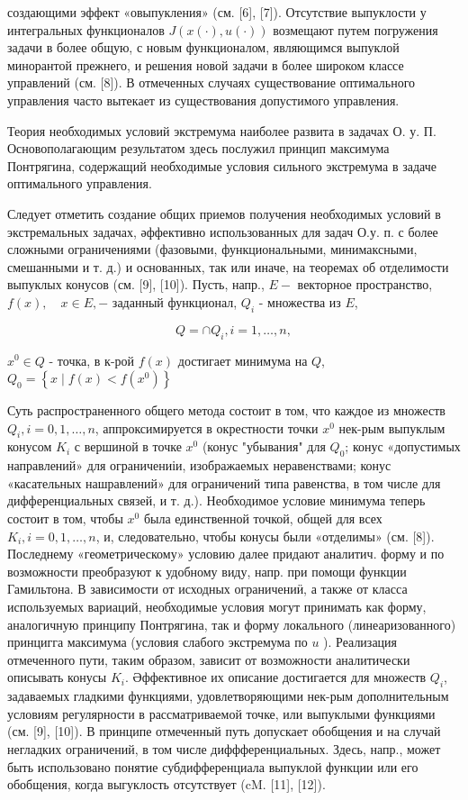 \documentclass[10pt]{article}
\begin{document}
создающими эффект «овыпукления» (см. [6], [7]). Отсутствие выпуклости у интегральных функционалов $J(x(\cdot), u(\cdot))$ возмещают путем погружения задачи в более общую, с новым функционалом, являющимся выпуклой минорантой прежнего, и решения новой задачи в более широком классе управлений (см. [8]). В отмеченных случаях существование оптимального управления часто вытекает из существования допустимого управления.

Теория необходимых условий экстремума наиболее развита в задачах О. у. П. Основополагающим результатом здесь послужил принцип максимума Понтрягина, содержащий необходимые условия сильного экстремума в задаче оптимального управления.

Следует отметить создание общих приемов получения необходимых условий в экстремальных задачах, әффективно использованных для задач О.у. п. с более сложными ограничениями (фазовыми, функциональными, минимаксными, смешанными и т. д.) и основанных, так или иначе, на теоремах об отделимости выпуклых конусов (см. [9], [10]). Пусть, напр., $E-$ векторное пространство, $f(x), \quad x \in E,-$ заданный функционал, $Q_{i}$ - множества из $E$,

\[
Q=\cap Q_{i}, i=1, \ldots, n,
\]

$x^{0} \in Q$ - точка, в к-рой $f(x)$ достигает минимума на $Q$, $Q_{0}=\left\{x \mid f(x)<f\left(x^{0}\right)\right\}$

Суть распространенного общего метода состоит в том, что каждое из множеств $Q_{i}, i=0,1, \ldots, n$, аппроксимируется в окрестности точки $x^{0}$ нек-рым выпуклым конусом $K_{i}$ с вершиной в точке $x^{0}$ (конус "убывания" для $Q_{0}$; конус «допустимых направлений» для ограничениіи, изображаемых неравенствами; конус «касательных нашравлений» для ограничений типа равенства, в том числе для дифференциальных связей, и т. д.). Необходимое условие минимума теперь состоит в том, чтобы $x^{0}$ была единственной точкой, общей для всех $K_{i}, i=0,1, \ldots, n$, и, следовательно, чтобы конусы были «отделимы» (см. [8]). Последнему «геометрическому» условию далее придают аналитич. форму и по возможности преобразуют к удобному виду, напр. при помощи функции Гамильтона. В зависимости от исходных ограничениӥ, а также от класса используемых вариаций, необходимые условия могут принимать как форму, аналогичную принципу Понтрягина, так и форму локального (линеаризованного) принцигга максимума (условия слабого экстремума по $u$ ). Реализация отмеченного пути, таким образом, зависит от возможности аналитически описывать конусы $K_{i}$. Әффективное их описание достигается для множеств $Q_{i}$, задаваемых гладкими функциями, удовлетворяющими нек-рым дополнительным условиям регулярности в рассматриваемой точке, или выпуклыми функциями (см. [9], [10]). В принципе отмеченный путь допускает обобщения и на случай негладких ограничений, в том числе диффференциальных. Здесь, напр., может быть использовано понятие субдифференциала выпуклой функции или его обобщения, когда выгуклость отсутствует (cM. [11], [12]).
\end{document}
